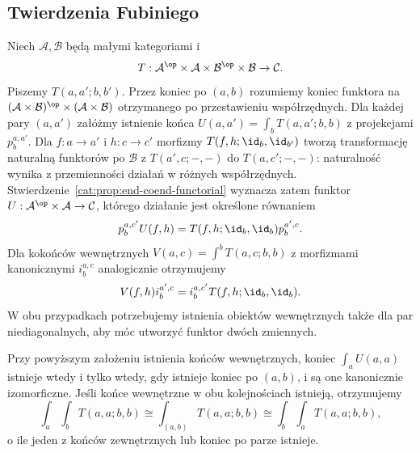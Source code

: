 \subsection{Twierdzenia Fubiniego}
Niech $\mathcal A,\mathcal B$ będą małymi kategoriami i
\[
 T:\mathcal A^{\op}\times\mathcal A\times
       \mathcal B^{\op}\times\mathcal B\to\mathcal C.
\]
Piszemy $T(a,a';b,b')$. Przez koniec po $(a,b)$ rozumiemy koniec funktora na $(\mathcal A\times\mathcal B)^{\op}\times(\mathcal A\times\mathcal B)$ otrzymanego po przestawieniu współrzędnych. Dla każdej pary $(a,a')$ załóżmy istnienie końca $U(a,a')=\int_bT(a,a';b,b)$ z projekcjami $p^{a,a'}_b$. Dla $f:a\to a'$ i $h:c\to c'$ morfizmy $T(f,h;\id_b,\id_{b'})$ tworzą transformację naturalną funktorów po $\mathcal B$ z $T(a',c;-,-)$ do $T(a,c';-,-)$: naturalność wynika z przemienności działań w różnych współrzędnych. Stwierdzenie~\ref{cat:prop:end-coend-functorial} wyznacza zatem funktor $U:\mathcal A^{\op}\times\mathcal A\to\mathcal C$, którego działanie jest określone równaniem
\[
 p^{a,c'}_b U(f,h)=T(f,h;\id_b,\id_b)p^{a',c}_b .
\]
Dla kokońców wewnętrznych $V(a,c)=\int^bT(a,c;b,b)$ z morfizmami kanonicznymi $i^{a,c}_b$ analogicznie otrzymujemy
\[
 V(f,h)i^{a',c}_b=i^{a,c'}_b T(f,h;\id_b,\id_b).
\]
W obu przypadkach potrzebujemy istnienia obiektów wewnętrznych także dla par niediagonalnych, aby móc utworzyć funktor dwóch zmiennych.
\begin{twierdzenie}\label{cat:thm:fubini-end}
Przy powyższym założeniu istnienia końców wewnętrznych, koniec $\int_a U(a,a)$ istnieje wtedy i tylko wtedy, gdy istnieje koniec po $(a,b)$, i są one kanonicznie izomorficzne. Jeśli końce wewnętrzne w obu kolejnościach istnieją, otrzymujemy
\[
 \int_a\int_b T(a,a;b,b)
 \cong\int_{(a,b)}T(a,a;b,b)
 \cong\int_b\int_a T(a,a;b,b),
\]
o ile jeden z końców zewnętrznych lub koniec po parze istnieje.
\end{twierdzenie}
